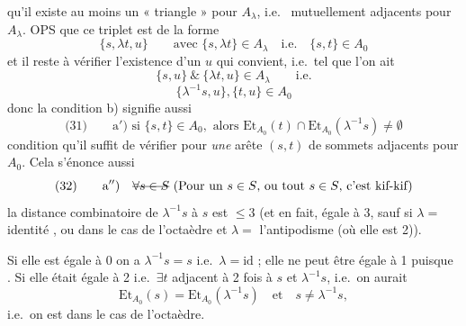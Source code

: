 \documentclass[11pt,a4paper]{article}
\begin{document}
qu'il existe au moins un « triangle » pour $A_\lambda$, i.e.\ 
 mutuellement adjacents pour $A_\lambda$.
\struck{\ill{}} OPS que ce triplet est de la forme 
\[
\{s, \lambda t, u\} \qquad \text{avec } \{s, \lambda t\} \in A_\lambda
\quad \text{i.e.} \quad \{s,t\} \in A_0
\]
et il reste à vérifier l'existence d'un $u$ qui convient, i.e.\ tel que l'on ait
\[
\{s,u\} \ \& \ \{\lambda t, u\} \in A_\lambda \qquad \text{i.e.}
\]
\[
\{\lambda^{-1} s, u\} , \{t, u\} \in A_0
\]
donc la condition b) signifie aussi
\[
\text{(31)} \qquad \text{a$'$) si } \{s,t\} \in A_0 , \text{ alors }
\mathrm{Et}_{A_0}(t) \cap \mathrm{Et}_{A_0}(\lambda^{-1} s) \neq \emptyset
\]
condition qu'il suffit de vérifier pour \emph{une} arête $(s,t)$ de sommets
adjacents pour $A_0$. Cela s'énonce aussi 
\[
\text{(32)} \qquad \text{a$''$)} \quad \text{\struck{$\forall s \in S$}}
\ \text{(Pour un } s \in S \text{, ou tout } s \in S \text{, c'est kif-kif)}
\]
la distance combinatoire de $\lambda^{-1} s$ à $s$ est $\leq 3$ (et en fait,
égale à 3, sauf si
$\lambda = $ identité , ou dans le cas de l'octaèdre et $\lambda =$
 l'antipodisme (où elle est 2)).


Si elle est égale à 0 on a $\lambda^{-1} s = s$ i.e.\ $\lambda = \mathrm{id}$ ;
elle ne peut être égale
à 1 puisque    \add{\uncertain{$=$}}  . Si elle était égale à 2 i.e.\
$\exists t$ adjacent à 2 fois à $s$ et
$\lambda^{-1} s$, i.e.\ on aurait
\[
\mathrm{Et}_{A_0}(s) = \mathrm{Et}_{A_0}(\lambda^{-1} s) \quad \text{et} \quad
s \neq \lambda^{-1} s ,
\]
i.e.\ on est dans le cas de l'octaèdre.
\end{document}
